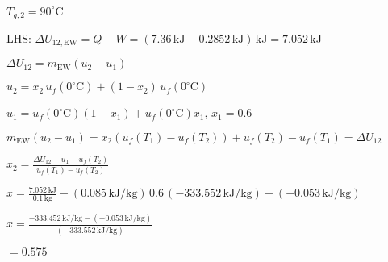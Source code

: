 \( T_{g,2} = 90^\circ \text{C} \)  

LHS:  
\( \Delta U_{12,\text{EW}} = Q - W = (7.36 \, \text{kJ} - 0.2852 \, \text{kJ}) \, \text{kJ} = 7.052 \, \text{kJ} \)  

\( \Delta U_{12} = m_{\text{EW}} (u_2 - u_1) \)  

\( u_2 = x_2 \, u_f(0^\circ \text{C}) + (1 - x_2) \, u_f(0^\circ \text{C}) \)  

\( u_1 = u_f(0^\circ \text{C}) (1 - x_1) + u_f(0^\circ \text{C}) x_1 \), \( x_1 = 0.6 \)  

\( m_{\text{EW}} (u_2 - u_1) = x_2 (u_f(T_1) - u_f(T_2)) + u_f(T_2) - u_f(T_1) = \Delta U_{12} \)  

\( x_2 = \frac{\Delta U_{12} + u_1 - u_f(T_2)}{u_f(T_1) - u_f(T_2)} \)  

\( x = \frac{7.052 \, \text{kJ}}{0.1 \, \text{kg}} - (0.085 \, \text{kJ/kg}) \, 0.6 \, (-333.552 \, \text{kJ/kg}) - (-0.053 \, \text{kJ/kg}) \)  

\( x = \frac{-333.452 \, \text{kJ/kg} - (-0.053 \, \text{kJ/kg})}{(-333.552 \, \text{kJ/kg})} \)  

\( = 0.575 \)